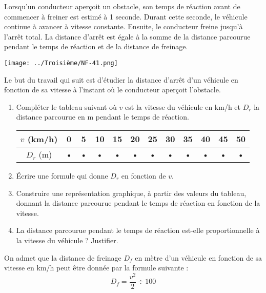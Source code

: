 
Lorsqu’un conducteur aperçoit un obstacle, son temps de réaction avant de commencer à freiner est estimé à 1 seconde. Durant cette seconde, le véhicule continue à avancer à vitesse constante. Ensuite, le conducteur freine jusqu’à l’arrêt total.
La distance d’arrêt est égale à la somme de la distance parcourue pendant le temps de réaction et de la distance de freinage.

\begin{center}
\texttt{[image: ../Troisième/NF-41.png]} 
\end{center}

Le but du travail qui suit est d’étudier la distance d’arrêt d’un véhicule en fonction de sa vitesse à l’instant où le conducteur aperçoit l’obstacle.



\begin{enumerate}
\item Compléter le tableau suivant où $v$ est la vitesse du véhicule en km/h et $D_r$ la distance parcourue en m pendant le temps de réaction.

\begin{tabular}{|c|c|c|c|c|c|c|c|c|c|c|c|}
\hline 
$v$ (km/h) & 0 & 5 & 10 & 15 & 20 & 25 & 30 & 35 & 40 & 45 & 50 \\ 
\hline 
$D_r$ (m) & • & • & • & • & • & • & • & • & • & • & • \\ 
\hline 
\end{tabular} 

\item Écrire une formule qui donne $D_r$ en fonction de $v$.
\item Construire une représentation graphique, à partir des valeurs du tableau, donnant la distance parcourue pendant le temps de réaction en fonction de la vitesse.
\item La distance parcourue pendant le temps de réaction est-elle proportionnelle à la vitesse du véhicule ? Justifier.
\end{enumerate}




On admet que la distance de freinage $D_f$ en mètre d'un véhicule en fonction de sa vitesse en km/h peut être donnée par la formule suivante :
$$D_f=\frac{v^2}{2} \div 100$$

